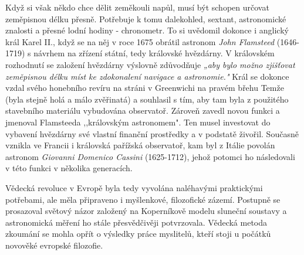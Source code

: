     Když si však někdo chce dělit zeměkouli napůl, musí být schopen určovat zeměpisnou délku přesně.
    Potřebuje k tomu dalekohled, sextant, astronomické znalosti a přesné lodní hodiny - chronometr.
    To si uvědomil dokonce i anglický král Karel II., když se na něj v roce 1675 obrátil astronom
    \emph{John Flamsteed} (1646-1719) s návrhem na zřízení státní, tedy královské hvězdárny. V
    královském rozhodnutí se založení hvězdárny výslovně zdůvodňuje \emph{„aby bylo možno zjišťovat
    zeměpisnou délku míst ke zdokonalení navigace a astronomie."} Král se dokonce vzdal svého
    honebního revíru na stráni v Greenwichi na pravém břehu Temže (byla stejně holá a málo
    zvěřinatá) a souhlasil s tím, aby tam byla z použitého stavebního materiálu vybudována
    observatoř. Zároveň zavedl novou funkci a jmenoval Flamsteeda ,,královským astronomem". Ten
    musel investovat do vybavení hvězdárny své vlastní finanční prostředky a v podstatě živořil.
    Současně vznikla ve Francii i královská pařížská observatoř, kam byl z Itálie povolán astronom
    \emph{Giovanni Domenico Cassini} (1625-1712), jehož potomci ho následovali v této funkci v
    několika generacích.

    Vědecká revoluce v Evropě byla tedy vyvolána naléhavými praktickými potřebami, ale měla
    připraveno i myšlenkové, filozofické zázemí. Postupně se prosazoval světový názor založený na
    Koperníkově modelu sluneční soustavy a astronomická měření ho stále přesvědčivěji potvrzovala.
    Vědecká metoda zkoumání se mohla opřít o výsledky práce myslitelů, kteří stoji u počátků
    novověké evropské filozofie.    

   
